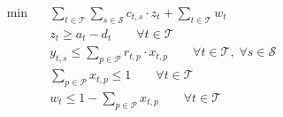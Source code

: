 \begin{align}
  \min\quad & \sum_{t \in \mathcal{T}} \sum_{s \in \mathcal{S}} c_{t,s} \cdot z_{t} + \sum_{t \in \mathcal{T}} w_{t} \tag{total\_delay} \\
  & z_{t} \ge a_{t} - d_{t} \qquad \forall t \in \mathcal{T} \tag{delay} \\
  & y_{t,s} \le \sum_{p \in \mathcal{P}} r_{t,p} \cdot x_{t,p} \qquad \forall t \in \mathcal{T},\; \forall s \in \mathcal{S} \tag{boarding} \\
  & \sum_{p \in \mathcal{P}} x_{t,p} \le 1 \qquad \forall t \in \mathcal{T} \tag{rerouting} \\
  & w_{t} \le 1 - \sum_{p \in \mathcal{P}} x_{t,p} \qquad \forall t \in \mathcal{T} \tag{cancellation} \\
\end{align}